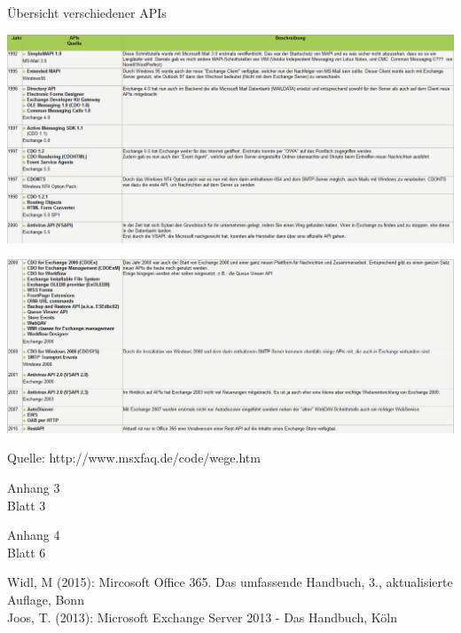 \noindent Übersicht verschiedener APIs
\begin{flushleft}
\includegraphics[width=1.0\textwidth]{Abbildungen/API_1.png}
\end{flushleft}
\label{API_1}
\begin{flushleft}
\includegraphics[width=1.0\textwidth]{Abbildungen/API_2.png}
\end{flushleft}
\noindent Quelle: http://www.msxfaq.de/code/wege.htm

\newpage

\begin{flushright}
Anhang 3\\
Blatt 3\\
\end{flushright}

\newpage

\begin{flushright}
Anhang 4\\
Blatt 6\\
\end{flushright}

\newpage

\noindent
Widl, M (2015): Mircosoft Office 365. Das umfassende Handbuch, 3., aktualisierte Auflage, Bonn\\
\noindent
Joos, T. (2013): Microsoft Exchange Server 2013 - Das Handbuch, Köln

